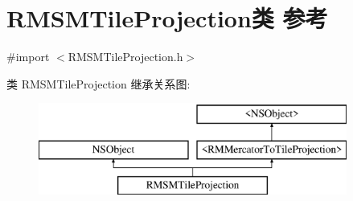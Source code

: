 \hypertarget{interface_r_m_s_m_tile_projection}{\section{R\-M\-S\-M\-Tile\-Projection类 参考}
\label{interface_r_m_s_m_tile_projection}
}


{\ttfamily \#import $<$R\-M\-S\-M\-Tile\-Projection.\-h$>$}

类 R\-M\-S\-M\-Tile\-Projection 继承关系图\-:\begin{figure}[H]
\begin{center}
\leavevmode
\includegraphics[height=3.000000cm]{interface_r_m_s_m_tile_projection}
\end{center}
\end{figure}
